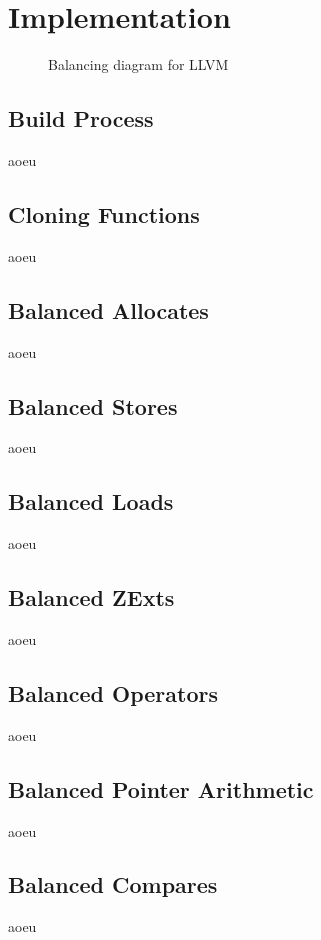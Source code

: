 \section{Implementation}
\label{implementation}

\begin{figure}[h]
  \caption{Balancing diagram for LLVM}
\end{figure}

\subsection{Build Process}
aoeu

\subsection{Cloning Functions}
aoeu

\subsection{Balanced Allocates}
aoeu

\subsection{Balanced Stores}
aoeu

\subsection{Balanced Loads}
aoeu

\subsection{Balanced ZExts}
aoeu

\subsection{Balanced Operators}
aoeu

\subsection{Balanced Pointer Arithmetic}
aoeu

\subsection{Balanced Compares}
aoeu
